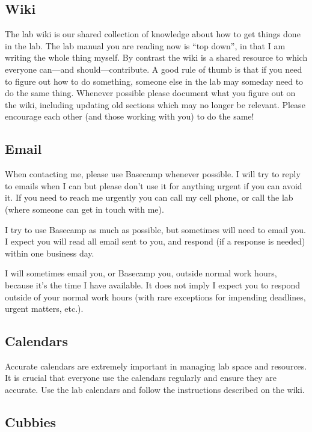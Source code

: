 \documentclass[letterpaper,12pt,oneside]{memoir}
\begin{document}
\subsection{Wiki}

The lab wiki is our shared collection of knowledge about how to get things done in the lab. The lab manual you are reading now is ``top down'', in that I am writing the whole thing myself. By contrast the wiki is a shared resource to which everyone can---and should---contribute. A good rule of thumb is that if you need to figure out how to do something, someone else in the lab may someday need to do the same thing. Whenever possible please document what you figure out on the wiki, including updating old sections which may no longer be relevant. Please encourage each other (and those working with you) to do the same!


\subsection{Email}
When contacting me, please use Basecamp whenever possible. I will try to reply to emails when I can but please don't use it for anything urgent if you can avoid it. If you need to reach me urgently you can call my cell phone, or call the lab (where someone can get in touch with me).

I try to use Basecamp as much as possible, but sometimes will need to email you. I expect you will read all email sent to you, and respond (if a response is needed) within one business day.

I will sometimes email you, or Basecamp you, outside normal work hours, because it's the time I have available. It does not imply I expect you to respond outside of your normal work hours (with rare exceptions for impending deadlines, urgent matters, etc.).

\subsection{Calendars}

Accurate calendars are extremely important in managing lab space and resources. It is crucial that everyone use the calendars regularly and ensure they are accurate. Use the lab calendars and follow the instructions described on the wiki.


\subsection{Cubbies}
\end{document}
